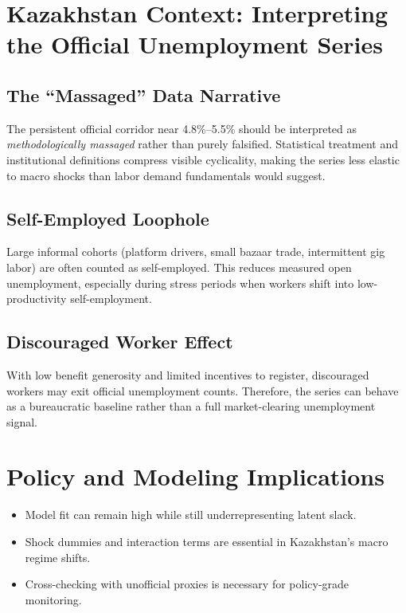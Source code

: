 \documentclass[11pt,a4paper]{article}
\begin{document}
\section{Kazakhstan Context: Interpreting the Official Unemployment Series}
\subsection{The ``Massaged'' Data Narrative}
The persistent official corridor near 4.8\%--5.5\% should be interpreted as \emph{methodologically massaged} rather than purely falsified. Statistical treatment and institutional definitions compress visible cyclicality, making the series less elastic to macro shocks than labor demand fundamentals would suggest.

\subsection{Self-Employed Loophole}
Large informal cohorts (platform drivers, small bazaar trade, intermittent gig labor) are often counted as self-employed. This reduces measured open unemployment, especially during stress periods when workers shift into low-productivity self-employment.

\subsection{Discouraged Worker Effect}
With low benefit generosity and limited incentives to register, discouraged workers may exit official unemployment counts. Therefore, the series can behave as a bureaucratic baseline rather than a full market-clearing unemployment signal.

\section{Policy and Modeling Implications}
\begin{itemize}
\item Model fit can remain high while still underrepresenting latent slack.
\item Shock dummies and interaction terms are essential in Kazakhstan’s macro regime shifts.
\item Cross-checking with unofficial proxies is necessary for policy-grade monitoring.
\end{itemize}
\end{document}
